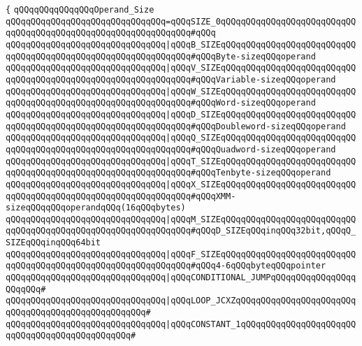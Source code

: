 \verb|{|\newline
\verb|qQQqqQQqqQQqqQQqOperand_Size|\newline
\verb|qQQqqQQqqQQqqQQqqQQqqQQqqQQqqQQq=qQQqSIZE_0qQQqqQQqqQQqqQQqqQQqqQQqqQQqqQQqqQQqqQQqqQQqqQQqqQQqqQQqqQQqqQQq#qQQq|\newline
\verb|qQQqqQQqqQQqqQQqqQQqqQQqqQQqqQQq|\verb#|qQQqB_SIZEqQQqqQQqqQQqqQQqqQQqqQQqqQQqqQQqqQQqqQQqqQQqqQQqqQQqqQQqqQQqqQQq#\verb|#qQQqByte-sizeqQQqoperand|\newline
\verb|qQQqqQQqqQQqqQQqqQQqqQQqqQQqqQQq|\verb#|qQQqV_SIZEqQQqqQQqqQQqqQQqqQQqqQQqqQQqqQQqqQQqqQQqqQQqqQQqqQQqqQQqqQQqqQQq#\verb|#qQQqVariable-sizeqQQqoperand|\newline
\verb|qQQqqQQqqQQqqQQqqQQqqQQqqQQqqQQq|\verb#|qQQqW_SIZEqQQqqQQqqQQqqQQqqQQqqQQqqQQqqQQqqQQqqQQqqQQqqQQqqQQqqQQqqQQqqQQq#\verb|#qQQqWord-sizeqQQqoperand|\newline
\verb|qQQqqQQqqQQqqQQqqQQqqQQqqQQqqQQq|\verb#|qQQqD_SIZEqQQqqQQqqQQqqQQqqQQqqQQqqQQqqQQqqQQqqQQqqQQqqQQqqQQqqQQqqQQqqQQq#\verb|#qQQqDoubleword-sizeqQQqoperand|\newline
\verb|qQQqqQQqqQQqqQQqqQQqqQQqqQQqqQQq|\verb#|qQQqQ_SIZEqQQqqQQqqQQqqQQqqQQqqQQqqQQqqQQqqQQqqQQqqQQqqQQqqQQqqQQqqQQqqQQq#\verb|#qQQqQuadword-sizeqQQqoperand|\newline
\verb|qQQqqQQqqQQqqQQqqQQqqQQqqQQqqQQq|\verb#|qQQqT_SIZEqQQqqQQqqQQqqQQqqQQqqQQqqQQqqQQqqQQqqQQqqQQqqQQqqQQqqQQqqQQqqQQq#\verb|#qQQqTenbyte-sizeqQQqoperand|\newline
\verb|qQQqqQQqqQQqqQQqqQQqqQQqqQQqqQQq|\verb#|qQQqX_SIZEqQQqqQQqqQQqqQQqqQQqqQQqqQQqqQQqqQQqqQQqqQQqqQQqqQQqqQQqqQQqqQQq#\verb|#qQQqXMM-sizeqQQqqQQqoperandqQQq(16qQQqbytes)|\newline
\verb|qQQqqQQqqQQqqQQqqQQqqQQqqQQqqQQq|\verb#|qQQqM_SIZEqQQqqQQqqQQqqQQqqQQqqQQqqQQqqQQqqQQqqQQqqQQqqQQqqQQqqQQqqQQqqQQq#\verb|#qQQqD_SIZEqQQqinqQQq32bit,qQQqQ_SIZEqQQqinqQQq64bit|\newline
\verb|qQQqqQQqqQQqqQQqqQQqqQQqqQQqqQQq|\verb#|qQQqF_SIZEqQQqqQQqqQQqqQQqqQQqqQQqqQQqqQQqqQQqqQQqqQQqqQQqqQQqqQQqqQQqqQQq#\verb|#qQQq4-6qQQqbyteqQQqpointer|\newline
\verb|qQQqqQQqqQQqqQQqqQQqqQQqqQQqqQQq|\verb#|qQQqCONDITIONAL_JUMPqQQqqQQqqQQqqQQqqQQqqQQq#\verb|#|\newline
\verb|qQQqqQQqqQQqqQQqqQQqqQQqqQQqqQQq|\verb#|qQQqLOOP_JCXZqQQqqQQqqQQqqQQqqQQqqQQqqQQqqQQqqQQqqQQqqQQqqQQqqQQq#\verb|#|\newline
\verb|qQQqqQQqqQQqqQQqqQQqqQQqqQQqqQQq|\verb#|qQQqCONSTANT_1qQQqqQQqqQQqqQQqqQQqqQQqqQQqqQQqqQQqqQQqqQQqqQQq#\verb|#|\newline
